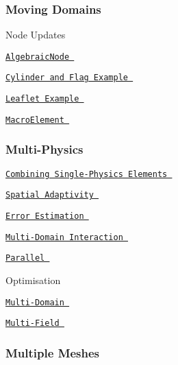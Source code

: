 \subsubsection*{ Moving Domains }

 
\begin{DoxyItemize}
\item  Node Updates   
\begin{DoxyItemize}
\item  \href{ ../../navier_stokes/algebraic_collapsible_channel/html/index.html#overview }{\tt Algebraic\-Node }  
\begin{DoxyItemize}
\item  \href{ ../../navier_stokes/turek_flag_non_fsi/html/index.html }{\tt Cylinder and Flag Example }  
\item  \href{ ../../navier_stokes/channel_with_leaflet/html/index.html }{\tt Leaflet Example }  
\end{DoxyItemize}
\item  \href{ ../../poisson/fish_poisson2/html/index.html#nod_update }{\tt Macro\-Element }  
\end{DoxyItemize} 
\end{DoxyItemize} \subsubsection*{ Multi-\/\-Physics }

 
\begin{DoxyItemize}
\item  \href{ ../../multi_physics/b_convection/html/index.html#element }{\tt Combining Single-\/\-Physics Elements }  
\begin{DoxyItemize}
\item  \href{ ../../multi_physics/refine_b_convect/html/index.html }{\tt Spatial Adaptivity }  
\end{DoxyItemize}
\item  \href{ ../../multi_physics/refine_b_convect/html/index.html#comments }{\tt Error Estimation }  
\item  \href{ ../../multi_physics/multi_domain_ref_b_convect/html/index.html#setting_up }{\tt Multi-\/\-Domain Interaction }  
\begin{DoxyItemize}
\item  \href{ ../../mpi/boussinesq_convection/html/index.html#multi_domain }{\tt Parallel }  
\end{DoxyItemize}
\item  Optimisation   
\begin{DoxyItemize}
\item  \href{ ../../multi_physics/multi_domain_ref_b_convect/html/index.html#optimise }{\tt Multi-\/\-Domain }  
\item  \href{ ../../multi_physics/b_convection/html/index.html#opt }{\tt Multi-\/\-Field }  
\end{DoxyItemize} 
\end{DoxyItemize} \subsubsection*{ Multiple Meshes }

